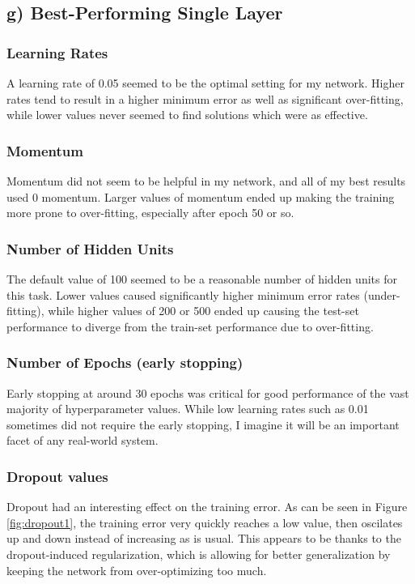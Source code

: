 \documentclass{article}
\begin{document}
\subsection{g) Best-Performing Single Layer}


\subsubsection*{Learning Rates}
A learning rate of 0.05 seemed to be the optimal setting for my network. Higher rates tend to result in a higher minimum error as well as significant over-fitting, while lower values never seemed to find solutions which were as effective. 

\subsubsection*{Momentum}
Momentum did not seem to be helpful in my network, and all of my best results used 0 momentum.  Larger values of momentum ended up making the training more prone to over-fitting, especially after epoch 50 or so.  

\subsubsection*{Number of Hidden Units}
The default value of 100 seemed to be a reasonable number of hidden units for this task.  Lower values caused significantly higher minimum error rates (under-fitting), while higher values of 200 or 500 ended up causing the test-set performance to diverge from the train-set performance due to over-fitting. 

\subsubsection*{Number of Epochs (early stopping)}
Early stopping at around 30 epochs was critical for good performance of the vast majority of hyperparameter values. While low learning rates such as 0.01 sometimes did not require the early stopping, I imagine it will be an important facet of any real-world system. 

\subsubsection*{Dropout values}

Dropout had an interesting effect on the training error. As can be seen in Figure \ref{fig:dropout1}, the training error very quickly reaches a low value, then oscilates up and down instead of increasing as is usual. This appears to be thanks to the dropout-induced regularization, which is allowing for better generalization by keeping the network from over-optimizing too much. 
\end{document}
